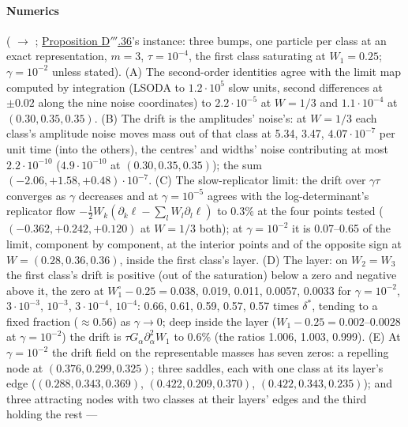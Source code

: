 \begin{sloppypar}
\paragraph{Numerics} ( $\to$ ;
\hyperref[res:thmDppp:36]{Proposition D$'''$.36}'s instance: three bumps, one particle per class at an exact
representation, $m = 3$, $\tau = 10^{-4}$, the first class saturating at $W_1 = 0.25$; $\gamma = 10^{-2}$ unless
stated). (A) The second-order identities agree with the limit map computed by integration (LSODA to $1.2\cdot10^5$ slow
units, second differences at $\pm0.02$ along the nine noise coordinates) to $2.2\cdot10^{-5}$ at $W = 1/3$ and
$1.1\cdot10^{-4}$ at $(0.30, 0.35, 0.35)$. (B) The drift is the amplitudes' noise's: at $W = 1/3$ each class's
amplitude noise moves mass out of that class at 5.34, 3.47, $4.07\cdot10^{-7}$ per unit time (into the others), the
centres' and widths' noise contributing at most $2.2\cdot10^{-10}$ ($4.9\cdot10^{-10}$ at $(0.30, 0.35, 0.35)$); the
sum $(-2.06,+1.58,+0.48)\cdot10^{-7}$. (C) The slow-replicator limit: the drift over $\gamma\tau$ converges as $\gamma$
decreases and at $\gamma = 10^{-5}$ agrees with the log-determinant's replicator flow
$-\frac12W_k(\partial_k\ell - \sum_lW_l\partial_l\ell)$ to 0.3\% at the four points tested ($(-0.362,+0.242,+0.120)$
at $W = 1/3$ both); at $\gamma = 10^{-2}$ it is 0.07--0.65 of the limit, component by component, at the interior points
and of the opposite sign at $W = (0.28, 0.36, 0.36)$, inside the first class's layer. (D) The layer: on $W_2 = W_3$ the
first class's drift is positive (out of the saturation) below a zero and negative above it, the zero at
$W_1^\circ - 0.25 = 0.038$, 0.019, 0.011, 0.0057, 0.0033 for $\gamma = 10^{-2}$, $3\cdot10^{-3}$, $10^{-3}$,
$3\cdot10^{-4}$, $10^{-4}$: 0.66, 0.61, 0.59, 0.57, 0.57 times $\delta^*$, tending to a fixed fraction ($\approx0.56$)
as $\gamma\to0$; deep inside the layer ($W_1 - 0.25 = 0.002$--$0.0028$ at $\gamma = 10^{-2}$) the drift is
$\tau G_\alpha\partial^2_\alpha W_1$ to 0.6\% (the ratios 1.006, 1.003, 0.999). (E) At $\gamma = 10^{-2}$ the drift
field on the representable masses has seven zeros: a repelling node at $(0.376, 0.299, 0.325)$; three saddles, each
with one class at its layer's edge ($(0.288, 0.343, 0.369)$, $(0.422, 0.209, 0.370)$, $(0.422, 0.343, 0.235)$); and
three attracting nodes with two classes at their layers' edges and the third holding the rest ---

\end{sloppypar}
